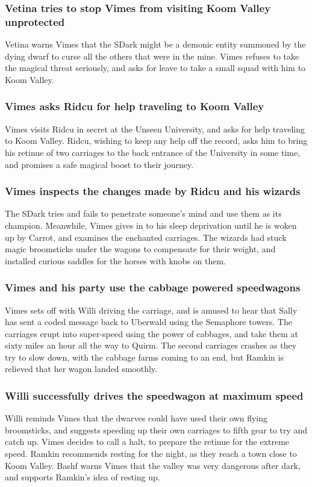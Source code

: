 \subsubsection{\Gls{Vetina} tries to stop \Gls{Vimes} from visiting Koom Valley unprotected}
\Gls{Vetina} warns \Gls{Vimes} that the \Gls{SDark} might be a demonic entity summoned by the
dying dwarf to curse all the others that were in the mine. \Gls{Vimes} refuses to take the magical
threat seriously, and asks for leave to take a small squad with him to Koom Valley.

\subsubsection{\Gls{Vimes} asks \Gls{Ridcu} for help traveling to Koom Valley}
\Gls{Vimes} visits \Gls{Ridcu} in secret at the Unseen University, and asks for help traveling to
Koom Valley. \Gls{Ridcu}, wishing to keep any help off the record, asks him to bring his retinue of
two carriages to the back entrance of the University in some time, and promises a safe magical
boost to their journey.

\subsubsection{\Gls{Vimes} inspects the changes made by \Gls{Ridcu} and his wizards}
The \Gls{SDark} tries and fails to penetrate someone's mind and use them as its champion. Meanwhile,
\Gls{Vimes} gives in to his sleep deprivation until he is woken up by \Gls{Carrot}, and examines the
enchanted carriages. The wizards had stuck magic broomsticks under the wagons to compensate for
their weight, and installed curious saddles for the horses with knobs on them.

\subsubsection{\Gls{Vimes} and his party use the cabbage powered speedwagons}
\Gls{Vimes} sets off with \Gls{Willi} driving the carriage, and is amused to hear that \Gls{Sally}
has sent a coded message back to Uberwald using the Semaphore towers. The carriages erupt into
super-speed using the power of cabbages, and take them at sixty miles an hour all the way to Quirm.
The second carriages crashes as they try to slow down, with the cabbage farms coming to an end, but
\Gls{Ramkin} is relieved that her wagon landed smoothly.

\subsubsection{\Gls{Willi} successfully drives the speedwagon at maximum speed}
\Gls{Willi} reminds \Gls{Vimes} that the dwarves could have used their own flying broomsticks, and
suggests speeding up their own carriages to fifth gear to try and catch up. \Gls{Vimes} decides to
call a halt, to prepare the retinue for the extreme speed. \Gls{Ramkin} recommends resting for the
night, as they reach a town close to Koom Valley. \Gls{Bashf} warns \Gls{Vimes} that the valley
was very dangerous after dark, and supports \Gls{Ramkin}'s idea of resting up.

